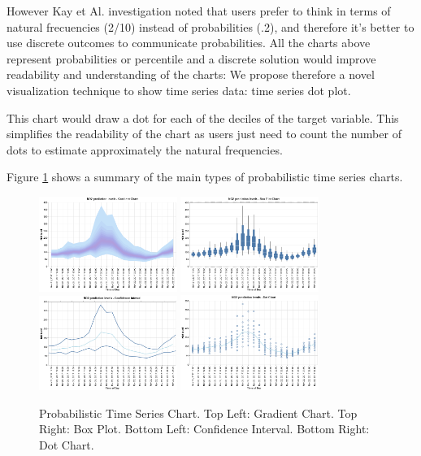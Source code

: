 \documentclass[a4paper,3p,sort&compress]{elsarticle}
\begin{document}
However Kay et Al. \cite{kay_when_2016} investigation noted that users prefer to think in terms of natural frecuencies (2/10) instead 
of probabilities (.2), and therefore it's better to use discrete outcomes to communicate probabilities. All the charts above 
represent probabilities or percentile and a discrete solution would improve readability and understanding of the charts: We
propose therefore a novel visualization technique to show time series data: time series dot plot. 

This chart would draw a dot for each of the deciles of the target variable. This simplifies the readability of the chart as
users just need to count the number of dots to estimate approximately the natural frequencies.

Figure \ref{figure:charts} shows a summary of the main types of probabilistic time series charts.

\begin{figure}
  \centering
  \includegraphics[width=0.4\textwidth]{gradient} 
  \includegraphics[width=0.4\textwidth]{boxplot}
  \includegraphics[width=0.4\textwidth]{ci} 
  \includegraphics[width=0.4\textwidth]{dot}
  \caption{\label{figure:charts} Probabilistic Time Series Chart. 
  Top Left: Gradient Chart. Top Right: Box Plot. 
  Bottom Left: Confidence Interval. Bottom Right: Dot Chart.  }
\end{figure}
\end{document}
